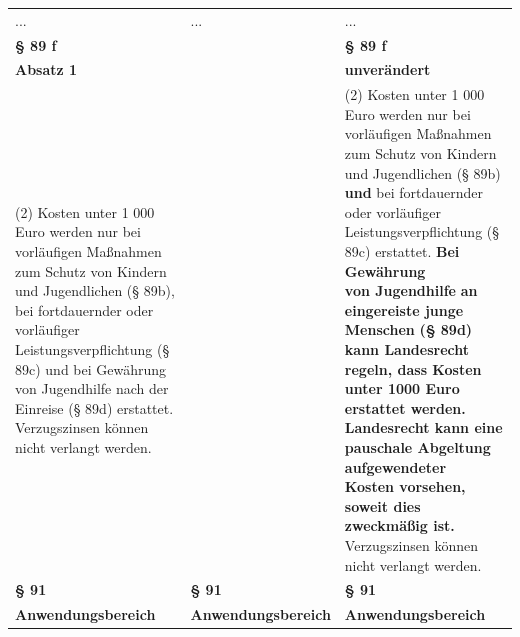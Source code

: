 \documentclass[10pt,a4paper,landscape]{article}
\begin{document}
\begin{longtable}{|L{8.2cm}|L{8.2cm}|L{8.2cm}|}
\hhline{|---|}
... & ... & ... \\
\hhline{|---|}
\textbf{\S{} 89 f} &  & \textbf{\S{} 89 f} \\
\hhline{|---|}
\textbf{Absatz 1} &  & \textbf{unverändert} \\
\hhline{|---|}
(2) Kosten unter 1 000 Euro werden nur bei  \newline vorläufigen Maßnahmen zum Schutz von  \newline Kindern und Jugendlichen (\S{} \textcolor{diffred}{89b),} bei  \newline fortdauernder oder vorläufiger  \newline Leistungsverpflichtung (\S{} 89c) \textcolor{diffred}{und bei}  \newline Gewährung von Jugendhilfe \textcolor{diffred}{nach der  \newline Einreise} (\S{} 89d) \textcolor{diffred}{erstattet.} Verzugszinsen  \newline können nicht verlangt werden. &  & (2) Kosten unter 1 000 Euro werden nur bei  \newline vorläufigen Maßnahmen zum Schutz von  \newline Kindern und Jugendlichen (\S{} \textcolor{diffgreen}{89b) }\textbf{\textcolor{diffgreen}{und}} bei  \newline fortdauernder oder vorläufiger  \newline Leistungsverpflichtung (\S{} 89c) \textcolor{diffgreen}{erstattet. }\textbf{\textcolor{diffgreen}{Bei}}\textbf{ Gewährung  \newline von Jugendhilfe }\textbf{\textcolor{diffgreen}{an eingereiste junge  \newline Menschen}}\textbf{ (\S{} 89d) }\textbf{\textcolor{diffgreen}{kann Landesrecht  \newline regeln, dass Kosten unter 1000 Euro  \newline erstattet werden. Landesrecht kann eine  \newline pauschale Abgeltung aufgewendeter  \newline Kosten vorsehen, soweit dies  \newline zweckmäßig ist.}} Verzugszinsen können  \newline nicht verlangt werden. \\
\hhline{|---|}
\textbf{\S{} 91} & \textbf{\S{} 91} & \textbf{\S{} 91} \\
\hhline{|---|}
\textbf{Anwendungsbereich } & \textbf{Anwendungsbereich } & \textbf{Anwendungsbereich } \\

\end{longtable}
\end{document}
